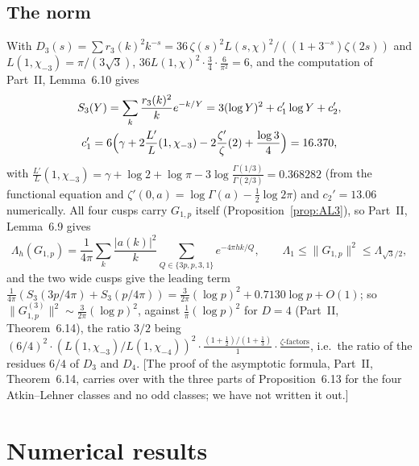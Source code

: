 \documentclass[11pt]{amsart}
\theoremstyle{remark}
\begin{document}
\subsection{The norm}
With $D_3(s)=\sum r_3(k)^2k^{-s}=36\,\zeta(s)^2L(s,\chi)^2/((1+3^{-s})\zeta(2s))$ and $L(1,\chi_{-3})=\pi/(3\sqrt3)$, $36L(1,\chi)^2\cdot\frac34\cdot\frac6{\pi^2}=6$, and the computation of Part~II, Lemma~6.10 gives
\begin{gather*}
S_3(Y)=\sum_k\frac{r_3(k)^2}ke^{-k/Y}=3(\log Y)^2+c_1'\log Y+c_2',\\
c_1'=6\Bigl(\gamma+2\frac{L'}L(1,\chi_{-3})-2\frac{\zeta'}\zeta(2)+\frac{\log3}4\Bigr)=16.370,
\end{gather*}
with $\frac{L'}L(1,\chi_{-3})=\gamma+\log2+\log\pi-3\log\frac{\Gamma(1/3)}{\Gamma(2/3)}=0.368282$ (from the functional equation and $\zeta'(0,a)=\log\Gamma(a)-\frac12\log2\pi$) and $c_2'=13.06$ numerically. All four cusps carry $G_{1,p}$ itself (Proposition~\ref{prop:AL3}), so Part~II, Lemma~6.9 gives
\[
\Lambda_h(G_{1,p})=\frac1{4\pi}\sum_k\frac{|a(k)|^2}k\sum_{Q\in\{3p,p,3,1\}}e^{-4\pi hk/Q},\qquad \Lambda_1\le\|G_{1,p}\|^2\le\Lambda_{\sqrt3/2},
\]
and the two wide cusps give the leading term $\frac1{4\pi}(S_3(3p/4\pi)+S_3(p/4\pi))=\frac3{2\pi}(\log p)^2+0.7130\log p+O(1)$; so $\|G^{(3)}_{1,p}\|^2\sim\frac3{2\pi}(\log p)^2$, against $\frac1\pi(\log p)^2$ for $D=4$ (Part~II, Theorem~6.14), the ratio $3/2$ being $(6/4)^2\cdot(L(1,\chi_{-3})/L(1,\chi_{-4}))^2\cdot\frac{(1+\frac12)/(1+\frac13)}{1}\cdot\frac{\zeta\text{-factors}}{}$, i.e.\ the ratio of the residues $6/4$ of $D_3$ and $D_4$. [The proof of the asymptotic formula, Part~II, Theorem~6.14, carries over with the three parts of Proposition~6.13 for the four Atkin--Lehner classes and no odd classes; we have not written it out.]

\section{Numerical results}\label{sec:results}
\end{document}
